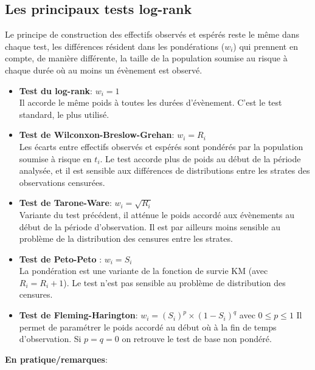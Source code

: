 \documentclass[
  12pt,
  letterpaper,
  DIV=11,
  numbers=noendperiod,
  onepage,
  openany]{scrreprt}
\begin{document}
\hypertarget{les-principaux-tests-log-rank}{%
\subsection{Les principaux tests
log-rank}\label{les-principaux-tests-log-rank}}

Le principe de construction des effectifs observés et espérés reste le
même dans chaque test, les différences résident dans les pondérations
(\(w_i\)) qui prennent en compte, de manière différente, la taille de la
population soumise au risque à chaque durée où au moins un évènement est
observé.

\begin{itemize}
\item
  \textbf{Test du log-rank}: \(w_i=1\)\\
  Il accorde le même poids à toutes les durées d'évènement. C'est le
  test standard, le plus utilisé.
\item
  \textbf{Test de Wilconxon-Breslow-Grehan}: \(w_i=R_i\)\\
  Les écarts entre effectifs observés et espérés sont pondérés par la
  population soumise à risque en \(t_i\). Le test accorde plus de poids
  au début de la période analysée, et il est sensible aux différences de
  distributions entre les strates des observations censurées.
\item
  \textbf{Test de Tarone-Ware}: \(w_i=\sqrt{R_i}\)\\
  Variante du test précédent, il atténue le poids accordé aux évènements
  au début de la période d'observation. Il est par ailleurs moins
  sensible au problème de la distribution des censures entre les
  strates.
\item
  \textbf{Test de Peto-Peto} : \(w_i=S_i\)\\
  La pondération est une variante de la fonction de survie KM (avec
  \(R_i=R_i+1\)). Le test n'est pas sensible au problème de distribution
  des censures.
\item
  \textbf{Test de Fleming-Harington}: \(w_i=(S_i)^p\times(1-S_i)^{q}\)
  avec \(0\leq{p}\leq{1}\) Il permet de paramétrer le poids accordé au
  début où à la fin de temps d'observation. Si \(p=q=0\) on retrouve le
  test de base non pondéré.
\end{itemize}

\textbf{En pratique/remarques}:
\end{document}
